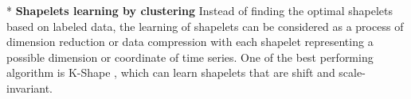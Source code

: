  
\/*
\textbf{Shapelets learning by clustering}
Instead of finding the optimal shapelets based on labeled data, the learning of shapelets can be considered as a process of dimension reduction or data compression with each shapelet representing a possible dimension or coordinate of time series. 
One of the best performing algorithm is K-Shape \cite{Paparrizos:2016:KEA:2949741.2949758}, which can learn shapelets that are shift and scale-invariant.
